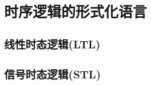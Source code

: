 \chapter{时序逻辑的形式化语言}

\vspace{-5pt}
\begin{center}
\end{center}

\section{线性时态逻辑(LTL)}

\begin{definition}

\end{definition}

\section{信号时态逻辑(STL)}

\begin{definition}

\end{definition}






